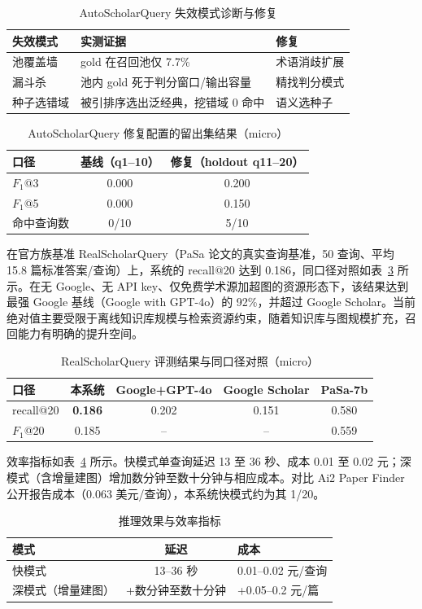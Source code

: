 \documentclass[12pt,a4paper]{ctexart}
\begin{document}
\begin{table}[htbp]
\centering
\small
\caption{AutoScholarQuery 失效模式诊断与修复}
\label{tab:fail}
\begin{tabularx}{\textwidth}{X X X}
\toprule
失效模式 & 实测证据 & 修复 \tabularnewline
\midrule
池覆盖墙 & gold 在召回池仅 7.7\% & 术语消歧扩展 \tabularnewline
漏斗杀 & 池内 gold 死于判分窗口/输出容量 & 精找判分模式 \tabularnewline
种子选错域 & 被引排序选出泛经典，挖错域 0 命中 & 语义选种子 \tabularnewline
\bottomrule
\end{tabularx}
\end{table}

\begin{table}[htbp]
\centering
\small
\caption{AutoScholarQuery 修复配置的留出集结果（micro）}
\label{tab:holdout}
\begin{tabularx}{\textwidth}{X c c}
\toprule
口径 & 基线（q1--10） & 修复（holdout q11--20） \tabularnewline
\midrule
$F_1$@3 & 0.000 & 0.200 \tabularnewline
$F_1$@5 & 0.000 & 0.150 \tabularnewline
命中查询数 & 0/10 & 5/10 \tabularnewline
\bottomrule
\end{tabularx}
\end{table}

在官方族基准 RealScholarQuery（PaSa 论文的真实查询基准，50 查询、平均 15.8 篇标准答案/查询）上，系统的 recall@20 达到 0.186，同口径对照如表~\ref{tab:rsq} 所示。在无 Google、无 API key、仅免费学术源加超图的资源形态下，该结果达到最强 Google 基线（Google with GPT-4o）的 92\%，并超过 Google Scholar。当前绝对值主要受限于离线知识库规模与检索资源约束，随着知识库与图规模扩充，召回能力有明确的提升空间。

\begin{table}[htbp]
\centering
\small
\caption{RealScholarQuery 评测结果与同口径对照（micro）}
\label{tab:rsq}
\begin{tabularx}{\textwidth}{X c c c c}
\toprule
口径 & 本系统 & Google+GPT-4o & Google Scholar & PaSa-7b \tabularnewline
\midrule
recall@20 & \textbf{0.186} & 0.202 & 0.151 & 0.580 \tabularnewline
$F_1$@20 & 0.185 & -- & -- & 0.559 \tabularnewline
\bottomrule
\end{tabularx}
\end{table}

效率指标如表~\ref{tab:eff} 所示。快模式单查询延迟 13 至 36 秒、成本 0.01 至 0.02 元；深模式（含增量建图）增加数分钟至数十分钟与相应成本。对比 Ai2 Paper Finder 公开报告成本（0.063 美元/查询），本系统快模式约为其 1/20。

\begin{table}[htbp]
\centering
\small
\caption{推理效果与效率指标}
\label{tab:eff}
\begin{tabularx}{\textwidth}{l c X}
\toprule
模式 & 延迟 & 成本 \tabularnewline
\midrule
快模式 & 13--36 秒 & 0.01--0.02 元/查询 \tabularnewline
深模式（增量建图） & +数分钟至数十分钟 & +0.05--0.2 元/篇 \tabularnewline
\bottomrule
\end{tabularx}
\end{table}
\end{document}
